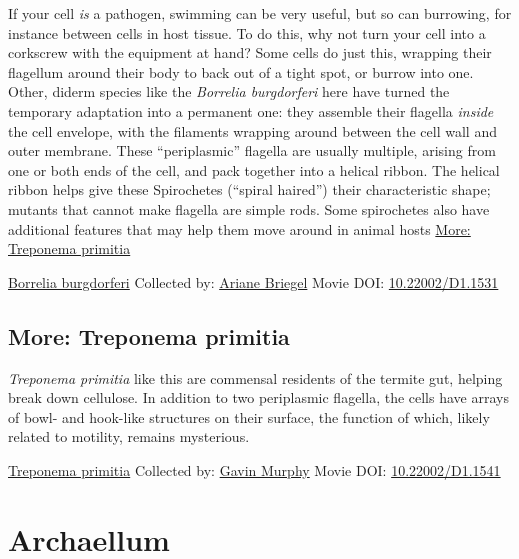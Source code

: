 \documentclass[]{tufte-book}
\begin{document}
If your cell \emph{is} a pathogen, swimming can be very useful, but so can burrowing, for instance between cells in host tissue. To do this, why not turn your cell into a corkscrew with the equipment at hand? Some cells do just this, wrapping their flagellum around their body to back out of a tight spot, or burrow into one. Other, diderm species like the \emph{Borrelia burgdorferi} here have turned the temporary adaptation into a permanent one: they assemble their flagella \emph{inside} the cell envelope, with the filaments wrapping around between the cell wall and outer membrane. These ``periplasmic'' flagella are usually multiple, arising from one or both ends of the cell, and pack together into a helical ribbon. The helical ribbon helps give these Spirochetes (``spiral haired'') their characteristic shape; mutants that cannot make flagella are simple rods. Some spirochetes also have additional features that may help them move around in animal hosts \protect\hyperlink{Treponema_primitia}{More: Treponema primitia}



\hypertarget{htmlwidget-e48f1e7f033075ef1ed7}{}

\label{fig:6-7}\protect\hyperlink{tree}{Borrelia burgdorferi} Collected by: \protect\hyperlink{ariane_briegel}{Ariane Briegel} Movie DOI: \href{https://doi.org/10.22002/D1.1531}{10.22002/D1.1531}

\hypertarget{Treponema_primitia}{%
\subsection*{More: Treponema primitia}\label{Treponema_primitia}}

\emph{Treponema primitia} like this are commensal residents of the termite gut, helping break down cellulose. In addition to two periplasmic flagella, the cells have arrays of bowl- and hook-like structures on their surface, the function of which, likely related to motility, remains mysterious.



\hypertarget{htmlwidget-db99b82d224b53f5c0f3}{}

\label{fig:6-7a}\protect\hyperlink{tree}{Treponema primitia} Collected by: \protect\hyperlink{gavin_murphy}{Gavin Murphy} Movie DOI: \href{https://doi.org/10.22002/D1.1541}{10.22002/D1.1541}

\hypertarget{archaellum}{%
\section{Archaellum}\label{archaellum}}
\end{document}
